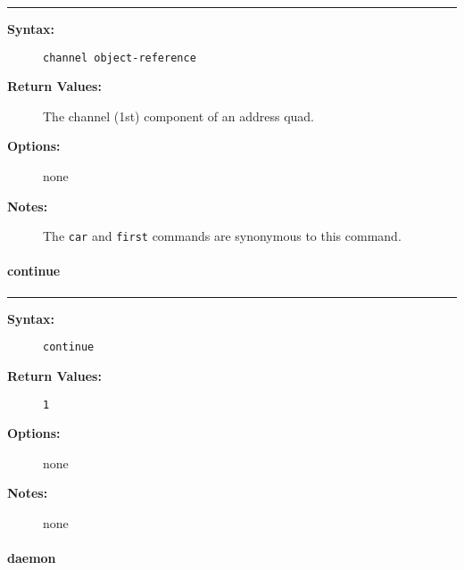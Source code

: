 \hrule
\begin{description}
\item[{\bf Syntax:}] \mbox{}

{\tt channel object-reference}

\item[{\bf Return Values:}] \mbox{}

The channel (1st) component of an address
quad.

\item[{\bf Options:}] \mbox{}

none  

\item[{\bf Notes:}] \mbox{}

The {\tt car} and {\tt first} commands are 
synonymous to this command. 

\end{description}


\vspace {2pt}


\paragraph{continue}

\hrule
\begin{description}
\item[{\bf Syntax:}] \mbox{}

{\tt continue}

\item[{\bf Return Values:}] \mbox{}

\begin{description}
\item[{\tt 1}] \mbox{}



\end{description}


\item[{\bf Options:}] \mbox{}

none  

\item[{\bf Notes:}] \mbox{}

none  

\end{description}


\vspace {2pt}


\paragraph{daemon}

